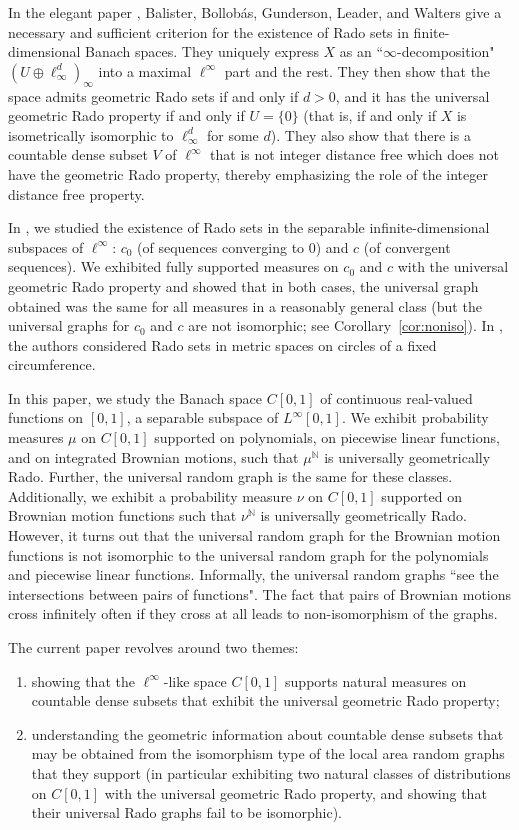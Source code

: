 \documentclass{daj}
\newcommand{\N}{\mathbb N}
\begin{document}
In the elegant paper \cite{BBGLW}, Balister,
Bollob\'as, Gunderson, Leader, and Walters
give a necessary and sufficient criterion for the existence of Rado sets in finite-dimensional Banach spaces.
They uniquely express $X$ as an ``$\infty$-decomposition" $(U\oplus\ell^d_\infty)_\infty$ into a
maximal $\ell^\infty$ part and the rest. They then show that the space
admits geometric Rado sets if and only if $d>0$, and it has the universal geometric Rado property if and only if $U=\{0\}$
(that is, if and only if $X$ is isometrically
isomorphic to $\ell^d_\infty$ for some $d$).
They also show that there is a countable dense subset $V$ of $\ell^\infty$ that is not integer distance
free which does not have the geometric Rado property, thereby emphasizing the role of
the integer distance free property. 

In \cite{BJQ1}, we studied the existence of Rado sets in the separable infinite-dimensional
subspaces of $\ell^\infty$: $c_0$ (of sequences converging to 0) and $c$ (of convergent sequences).
We exhibited fully supported measures on $c_0$ and $c$  with the universal geometric Rado property
and showed that in both cases, the universal graph obtained was the same for all measures in a
reasonably general class (but the universal graphs for $c_0$ and $c$ are not isomorphic; see
Corollary~\ref{cor:noniso}). In \cite{AS}, the authors considered Rado sets in metric spaces on circles of a fixed
circumference.

In this paper, we study the Banach space $C[0,1]$ of continuous real-valued functions on $[0,1]$,
a separable subspace of $L^\infty[0,1]$.
We exhibit probability measures $\mu$ on $C[0,1]$ supported on polynomials,
on piecewise linear functions, and on integrated Brownian motions,
such that $\mu^\N$ is universally geometrically Rado. Further, the universal random graph is the same for
these classes. Additionally, we exhibit a probability measure $\nu$ on $C[0,1]$ supported on Brownian motion
functions such that $\nu^\N$ is universally geometrically Rado.
However, it turns out that the universal random
graph for the Brownian motion functions is not isomorphic to the
universal random graph for the polynomials and piecewise
linear functions.
Informally, the universal random graphs ``see the intersections between pairs of functions". The fact that
pairs of Brownian motions cross infinitely often if they cross at all leads to non-isomorphism of the graphs.

The current paper revolves around two themes:
\begin{enumerate}
\item
showing that the $\ell^\infty$-like space $C[0,1]$ supports natural measures on countable dense subsets
that exhibit the universal geometric Rado property;
\item
understanding the geometric information about countable dense subsets that may be obtained
from the isomorphism type of the local area random graphs that they support (in particular
exhibiting two natural classes of distributions on $C[0,1]$ with the universal geometric
Rado property, and showing that their universal Rado graphs fail to be isomorphic).
\end{enumerate}
\end{document}
